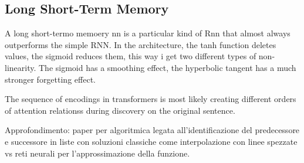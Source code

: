 \subsection*{Long Short-Term Memory}
A long short-termo memoery nn is a particular kind of Rnn that almost always outperforms the simple RNN. In the architecture, the tanh function deletes values, the sigmoid reduces them, this way i get two different types of non-linearity. The sigmoid has a smoothing effect, the hyperbolic tangent has a much stronger forgetting effect.

The sequence of encodings in transformers is most likely creating different orders of attention relationss during discovery on the original sentence.




Approfondimento: paper per algoritmica legata all'identificazione del predecessore e successore in liste con soluzioni classiche come interpolazione con linee spezzate vs reti neurali per l'approssimazione della funzione. 


